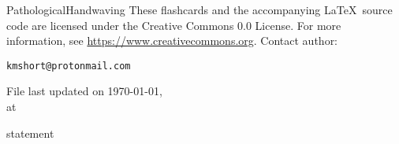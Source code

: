 \documentclass[avery5371,grid]{flashcards}
\begin{document}
\begin{flashcard}[License]{PathologicalHandwaving}
These flashcards and the accompanying \LaTeX \, source code are licensed
under the Creative Commons 0.0 License.
For more information, see \url{https://www.creativecommons.org}.
Contact author: \\
\begin{center}
\begin{small}\texttt{kmshort@protonmail.com}\end{small}

\medskip
File last updated on \today, \\
at \currenttime
\end{center}
\end{flashcard}


\begin{flashcard}[Definition]{statement}


\end{flashcard}
\end{document}
